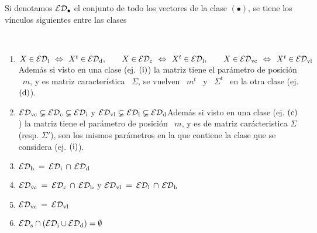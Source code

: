 Si  denotamos  $\mathcal{ED}_\bullet$  el conjunto  de  todo  los  vectores de  la  clase
$(\bullet)$, se tiene los v\'inculos siguientes entre las clases
%
\begin{lema}

  \

  \begin{enumerate}
  \item\label{Enum:MP:EDM_Traspuesta} $X \in \mathcal{ED}_{\mathrm{i}} \:\: \Leftrightarrow \:\:
    X^t \in  \mathcal{ED}_{\mathrm{d}}, \qquad X \in  \mathcal{ED}_{\mathrm{c}} \:\: \Leftrightarrow  \:\: X^t \in
    \mathcal{ED}_{\mathrm{l}},  \qquad  X  \in   \mathcal{ED}_{\mathrm{vc}}  \:\:  \Leftrightarrow  \:\:  X^t  \in
    \mathcal{ED}_{\mathrm{vl}}$\newline Adem\'as si  visto en una clase (ej.  $(\mathrm{i})$) la matriz
    tiene el  par\'ametro de  posici\'on \ $m$,  y es matriz  caracter\'istica \
    $\Sigma$,  se  vuelven  \  $m^t$  \  y  \ $\Sigma^t$  \  en  la  otra  clase
    (ej. $(\mathrm{d})$).
  \item\label{Enum:MP:EDM_Inclusiones}    $\mathcal{ED}_{\mathrm{vc}}    \varsubsetneq   \mathcal{ED}_{\mathrm{c}}
    \varsubsetneq  \mathcal{ED}_{\mathrm{i}}$ \qquad y  \qquad $\mathcal{ED}_{\mathrm{vl}}  \varsubsetneq \mathcal{ED}_{\mathrm{l}}
    \varsubsetneq   \mathcal{ED}_{\mathrm{d}}$\newline   Adem\'as   si   visto   en   una   clase
    (ej. $(\mathrm{c})$) la  matriz tiene el par\'ametro de posici\'on \  $m$, y es de
    matriz   car\'acteristica  $\Sigma$  (resp.   $\Sigma'$),  son   los  mismos
    par\'ametros en la que contiene la clase que se considera (ej. $(\mathrm{i})$).
  \item\label{Enum:MP:EDM_Bilateral}  $\mathcal{ED}_{\mathrm{b}}  \: =  \:  \mathcal{ED}_{\mathrm{i}}  \, \cap  \,
    \mathcal{ED}_{\mathrm{d}}$
  \item\label{Enum:MP:EDM_VcBilateral} $\mathcal{ED}_{\mathrm{vc}}  \: =  \: \mathcal{ED}_{\mathrm{c}} \,  \cap \,
    \mathcal{ED}_{\mathrm{b}}$ \qquad y \qquad $\mathcal{ED}_{\mathrm{vl}} \: = \: \mathcal{ED}_{\mathrm{l}} \, \cap \, \mathcal{ED}_{\mathrm{b}}$
  \item\label{Enum:MP:EDM_VcVlIdenticos} $\mathcal{ED}_{\mathrm{vc}}  \: =  \: \mathcal{ED}_{\mathrm{vl}}$
  \item\label{Enum:MP:EDM_Simetrica}  $\mathcal{ED}_{\mathrm{s}}   \cap  \left(  \mathcal{ED}_{\mathrm{i}}  \cup
      \mathcal{ED}_{\mathrm{d}} \right) = \emptyset$
  \end{enumerate}
\end{lema}
%
